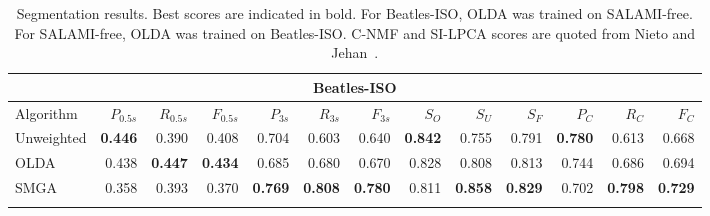 \documentclass{article}
\begin{document}
\begin{table}
\centering
\caption{Segmentation results.  Best scores are indicated in bold. For Beatles-ISO, OLDA was trained on SALAMI-free. For
SALAMI-free, OLDA was trained on Beatles-ISO.  C-NMF and SI-LPCA scores are quoted from Nieto and Jehan~\cite{nieto2013convex}.\label{tab:results}}
\begin{tabular}{lrrrrrrrrrrrr}
\multicolumn{13}{c}{Beatles-ISO}\\
\toprule%
Algorithm   &   $P_{0.5s}$ & $R_{0.5s}$ & $F_{0.5s}$ & $P_{3s}$     & $R_{3s}$  & $F_{3s}$   & $S_O$ & $S_U$ & $S_F$ & $P_C$& $R_C$& $F_C$\\
\hline
Unweighted  &   \textbf{0.446} & 0.390 & 0.408 & 0.704   & 0.603 & 0.640 & \textbf{0.842} & 0.755 & 0.791 & \textbf{0.780} & 0.613 & 0.668\\
OLDA        &   0.438 & \textbf{0.447} & \textbf{0.434} & 0.685   & 0.680 & 0.670 & 0.828 & 0.808 & 0.813 & 0.744 & 0.686 & 0.694\\
\hline
SMGA~\hfill\cite{serra2012unsupervised}
            &   0.358 & 0.393 & 0.370 & \textbf{0.769}   & \textbf{0.808} & \textbf{0.780} & 0.811 & \textbf{0.858} & \textbf{0.829} & 0.702 & \textbf{0.798} &
            \textbf{0.729}\\
\bottomrule%
\\


\end{tabular}
\end{table}
\end{document}
